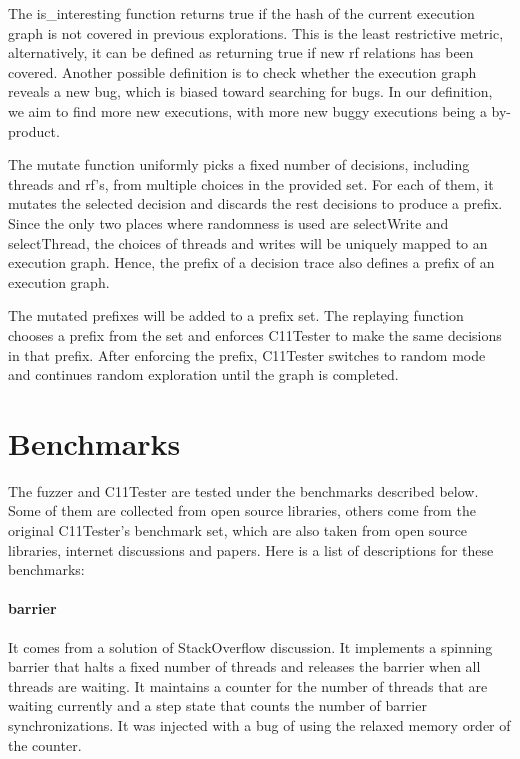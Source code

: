 The is\_interesting function returns true if the hash of the current execution graph is not covered in previous explorations. This is the least restrictive metric, alternatively, it can be defined as returning true if new rf relations has been covered. Another possible definition is to check whether the execution graph reveals a new bug, which is biased toward searching for bugs. In our definition, we aim to find more new executions, with more new buggy executions being a by-product.

The mutate function uniformly picks a fixed number of decisions, including threads and rf's, from multiple choices in the provided set. For each of them, it mutates the selected decision and discards the rest decisions to produce a prefix. Since the only two places where randomness is used are selectWrite and selectThread, the choices of threads and writes will be uniquely mapped to an execution graph. Hence, the prefix of a decision trace also defines a prefix of an execution graph.



The mutated prefixes will be added to a prefix set. The replaying function chooses a prefix from the set and enforces C11Tester to make the same decisions in that prefix. After enforcing the prefix, C11Tester switches to random mode and continues random exploration until the graph is completed.

\section{Benchmarks}

The fuzzer and C11Tester are tested under the benchmarks described below. Some of them are collected from open source libraries, others come from the original C11Tester's benchmark set, which are also taken from open source libraries, internet discussions and papers. Here is a list of descriptions for these benchmarks:

\paragraph{barrier} It comes from a solution of StackOverflow discussion. It implements a spinning barrier that halts a fixed number of threads and releases the barrier when all threads are waiting. It maintains a counter for the number of threads that are waiting currently and a step state that counts the number of barrier synchronizations. It was injected with a bug of using the relaxed memory order of the counter.

